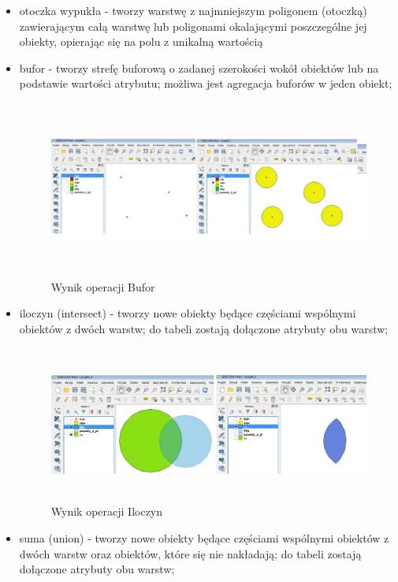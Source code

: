 \documentclass[12pt,a4paper]{book}
\begin{document}
\begin{itemize}
\item otoczka wypukła - tworzy warstwę z najmniejszym poligonem (otoczką) zawierającym całą warstwę lub poligonami okalającymi poszczególne jej obiekty, opierając się na polu z unikalną wartością
\item bufor - tworzy strefę buforową o zadanej szerokości wokół obiektów lub na podstawie wartości atrybutu; możliwa jest agregacja buforów w jeden obiekt;
\begin{center}
\begin{figure}
\includegraphics[width=16.859cm,height=5.803cm]{003-bufor.jpg}
\caption{Wynik operacji Bufor}
\end{figure}
\end{center}
\item iloczyn (intersect) - tworzy nowe obiekty będące częściami wspólnymi obiektów z dwóch warstw; do tabeli zostają dołączone atrybuty obu warstw;
\begin{center}
\begin{figure}
\includegraphics[width=16.365cm,height=5.112cm]{003-iloczyn.png}
\caption{Wynik operacji Iloczyn}
\end{figure}
\end{center}
\item suma (union) - tworzy nowe obiekty będące częściami wspólnymi obiektów z dwóch warstw oraz obiektów, które się nie nakładają; do tabeli zostają dołączone atrybuty obu warstw;

\end{itemize}
\end{document}
